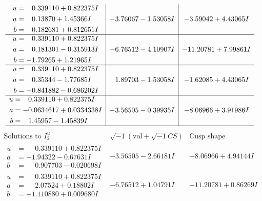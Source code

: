 \documentclass[1p]{elsarticle_modified}
\theoremstyle{definition}
\newcommand{\I}{\sqrt{-1}}
\begin{document}
$$\begin{array}{c|c|c}
\begin{aligned}
u &= \phantom{-}0.339110 + 0.822375 I \\
a &= \phantom{-}0.13870 + 1.45366 I \\
b &= \phantom{-}0.182681 + 0.812651 I\end{aligned}
 & -3.76067 - 1.53058 I & -3.59042 + 4.43065 I \\ \hline\begin{aligned}
u &= \phantom{-}0.339110 + 0.822375 I \\
a &= \phantom{-}0.181301 - 0.315913 I \\
b &= -1.79265 + 1.21965 I\end{aligned}
 & -6.76512 - 4.10907 I & -11.20781 + 7.99861 I \\ \hline\begin{aligned}
u &= \phantom{-}0.339110 + 0.822375 I \\
a &= \phantom{-}0.35344 - 1.77685 I \\
b &= -0.841882 - 0.686202 I\end{aligned}
 & \phantom{-}1.89703 - 1.53058 I & -1.62085 + 4.43065 I \\ \hline\begin{aligned}
u &= \phantom{-}0.339110 + 0.822375 I \\
a &= -0.0634617 + 0.0334338 I \\
b &= \phantom{-}1.45957 - 1.45839 I\end{aligned}
 & -3.56505 - 0.39935 I & -8.06966 + 3.91986 I\\
 \hline 
 \end{array}$$\newpage$$\begin{array}{c|c|c}  
\text{Solutions to }I^u_{2}& \I (\text{vol} + \sqrt{-1}CS) & \text{Cusp shape}\\
 \hline 
\begin{aligned}
u &= \phantom{-}0.339110 + 0.822375 I \\
a &= -1.94322 - 0.67631 I \\
b &= \phantom{-}0.907703 - 0.020698 I\end{aligned}
 & -3.56505 - 2.66181 I & -8.06966 + 4.94144 I \\ \hline\begin{aligned}
u &= \phantom{-}0.339110 + 0.822375 I \\
a &= \phantom{-}2.07524 + 0.18802 I \\
b &= -1.110880 + 0.009680 I\end{aligned}
 & -6.76512 + 1.04791 I & -11.20781 + 0.86269 I \\ \hline\begin{aligned}

\end{aligned}
\end{array}$$
\end{document}
